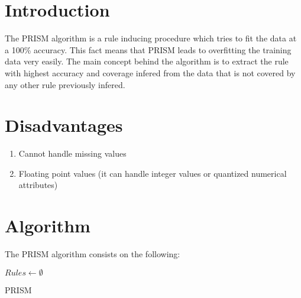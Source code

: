 \section{Introduction}

The PRISM\cite{cendrowska1987prism} algorithm is a rule inducing procedure which tries to fit the data at a 100\% accuracy. This fact means that PRISM leads to overfitting the training data very easily. The main concept behind the algorithm is to extract the rule with highest accuracy and coverage infered from the data that is not covered by any other rule previously infered.

\section{Disadvantages}

\begin{enumerate}
    \item Cannot handle missing values
    \item Floating point values (it can handle integer values or quantized numerical attributes)
\end{enumerate}

\section{Algorithm}
\label{section:algorithm}

The PRISM algorithm consists on the following:

\begin{algorithm}[H]
\SetAlgoLined
    $Rules \leftarrow \emptyset$\;
\caption{PRISM}
\label{prism-algorithm}
\end{algorithm}

